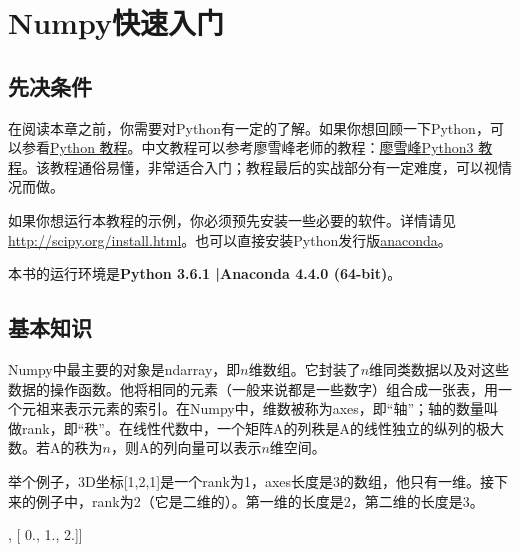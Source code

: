 \chapter{Numpy快速入门}
\section{先决条件}
在阅读本章之前，你需要对Python有一定的了解。如果你想回顾一下Python，可以参看\href{https://docs.python.org/}{Python 教程}。中文教程可以参考廖雪峰老师的教程：\href{https://www.liaoxuefeng.com/}{廖雪峰Python3 教程}。该教程通俗易懂，非常适合入门；教程最后的实战部分有一定难度，可以视情况而做。

如果你想运行本教程的示例，你必须预先安装一些必要的软件。详情请见\url{http://scipy.org/install.html}。也可以直接安装Python发行版\href{https://www.anaconda.com/download/}{anaconda}。

本书的运行环境是\textbf{Python 3.6.1 |Anaconda 4.4.0 (64-bit)}。

\section{基本知识}
Numpy中最主要的对象是ndarray，即$n$维数组。它封装了$n$维同类数据以及对这些数据的操作函数。他将相同的元素（一般来说都是一些数字）组合成一张表，用一个元祖来表示元素的索引。在Numpy中，维数被称为axes，即“轴”；轴的数量叫做rank，即“秩”。在线性代数中，一个矩阵A的列秩是A的线性独立的纵列的极大数。若A的秩为$n$，则A的列向量可以表示$n$维空间。

举个例子，3D坐标[1,2,1]是一个rank为1，axes长度是3的数组，他只有一维。接下来的例子中，rank为2（它是二维的）。第一维的长度是2，第二维的长度是3。
\begin{python}
[[ 1., 0., 0.],
[ 0., 1., 2.]]
\end{python}

